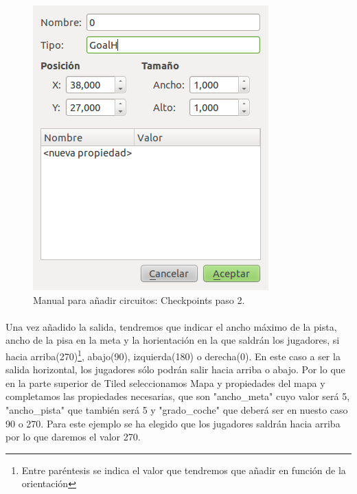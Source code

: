 \begin{figure}[H]
  \label{checkpoints2}
  \begin{center}
    \includegraphics[scale=0.5]{imagenes/manualcircuito/checkpoints2.png}
  \end{center}
  \caption{Manual para añadir circuitos: Checkpoints paso 2.}
\end{figure}

\paragraph{}
Una vez añadido la salida, tendremos que indicar el ancho máximo de la pista, ancho de la pisa en la meta y la horientación en la 
que saldrán los jugadores, si hacia arriba(270)\footnote{Entre paréntesis se indica el valor que tendremos que añadir en función 
de la orientación}, abajo(90), izquierda(180) o derecha(0). En este caso a ser la salida horizontal, 
los jugadores sólo podrán salir hacia arriba o abajo. Por lo que en la parte superior de Tiled seleccionamos Mapa y propiedades 
del mapa y completamos las propiedades necesarias, que son "ancho\_meta" cuyo valor será 5, "ancho\_pista" que también será 5 y 
"grado\_coche" que deberá ser en nuesto caso 90 o 270. Para este ejemplo se ha elegido que los jugadores saldrán hacia arriba por lo
que daremos el valor 270.

